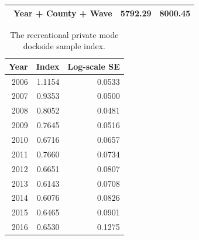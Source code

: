 \documentclass[12pt,]{article}
\begin{document}
\begin{table}[ht]
\begin{tabular}{lll}
  ~Year + County + Wave & \textbf{5792.29} & \textbf{8000.45} \\ 
   \hline
\end{tabular}
\end{table}\begin{table}[ht]
\centering
\caption{The recreational private mode 
                                            dockside sample index.} 
\label{tab:Fleet4_RecPR_dockside_index}
\begin{tabular}{rrr}
  \hline
Year & Index & Log-scale SE \\ 
  \hline
 2006 & 1.1154 & 0.0533 \\ 
   2007 & 0.9353 & 0.0500 \\ 
   2008 & 0.8052 & 0.0481 \\ 
   2009 & 0.7645 & 0.0516 \\ 
   2010 & 0.6716 & 0.0657 \\ 
   2011 & 0.7660 & 0.0734 \\ 
   2012 & 0.6651 & 0.0807 \\ 
   2013 & 0.6143 & 0.0708 \\ 
   2014 & 0.6076 & 0.0826 \\ 
   2015 & 0.6465 & 0.0901 \\ 
   2016 & 0.6530 & 0.1275 \\ 
   \hline
\end{tabular}
\end{table}

\FloatBarrier
\end{document}
